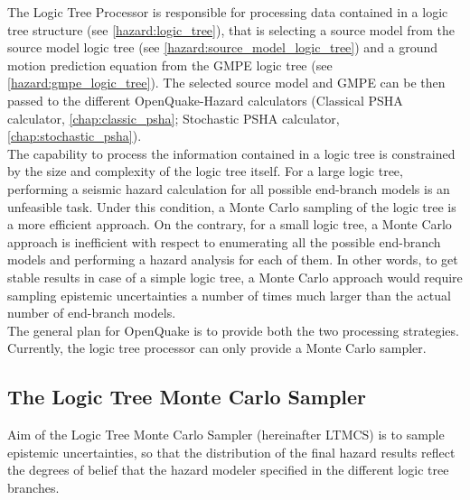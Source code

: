 The Logic Tree Processor is responsible for processing data contained in a logic tree structure (see \ref{hazard:logic_tree}), that is selecting a source model from the source model logic tree (see \ref{hazard:source_model_logic_tree}) and a ground motion prediction equation from the GMPE logic tree (see \ref{hazard:gmpe_logic_tree}). The selected source model and GMPE can be then passed to the different OpenQuake-Hazard calculators (Classical PSHA calculator, \ref{chap:classic_psha}; Stochastic PSHA calculator, \ref{chap:stochastic_psha}).\\
The capability to process the information contained in a logic tree is constrained by the size and complexity of the logic tree itself. For a large logic tree, performing a seismic hazard calculation for all possible end-branch models is an unfeasible task. Under this condition, a Monte Carlo sampling of the logic tree is a more efficient approach. On the contrary, for a small logic tree, a Monte Carlo approach is inefficient with respect to enumerating all the possible end-branch models and performing a hazard analysis for each of them. In other words, to get stable results in case of a simple logic tree,  a Monte Carlo approach would require sampling epistemic uncertainties a number of times much larger than the actual number of end-branch models.\\
The general plan for OpenQuake is to provide both the two processing strategies. Currently, the logic tree processor can only provide a Monte Carlo sampler.
\subsection{The Logic Tree Monte Carlo Sampler}
Aim of the Logic Tree Monte Carlo Sampler (hereinafter LTMCS) is to sample epistemic uncertainties, so that the distribution of the final hazard results reflect the degrees of belief that the hazard modeler specified in the different logic tree branches.\\
